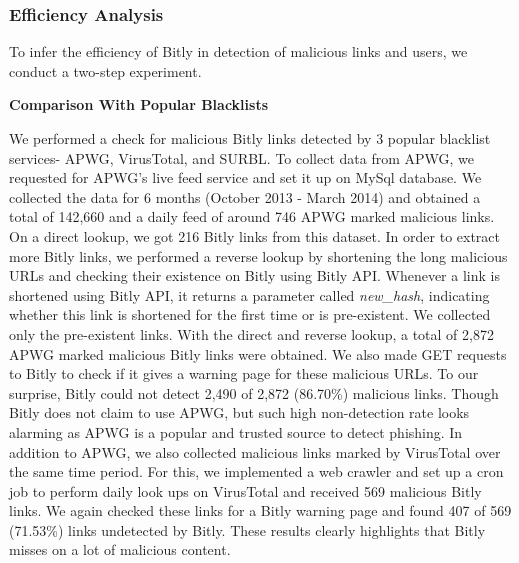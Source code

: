 \documentclass[conference]{IEEEtran}
\begin{document}
\subsubsection{Efficiency Analysis}\label{Efficiency Analysis}
To infer the efficiency of Bitly in detection of malicious links and users, we conduct a two-step experiment.

\vspace{4pt}
\textbf{Comparison With Popular Blacklists}


We performed a check for malicious Bitly links detected by 3 popular blacklist services- APWG, VirusTotal, and SURBL.
To collect data from APWG, we requested for APWG's live feed service and set it up on MySql database. We collected the data for 6 months (October 2013 - March 2014) and obtained a total of 142,660 and a daily feed of around 746 APWG marked malicious links. On a direct lookup, we got 216 Bitly links from this dataset. In order to extract more Bitly links, we performed a reverse lookup by shortening the long malicious URLs and checking their existence on Bitly using Bitly API. Whenever a link is shortened using Bitly API, it returns a parameter called \textit{new\_hash}, indicating whether this link is shortened for the first time or is pre-existent. We collected only the pre-existent links. With the direct and reverse lookup, a total of 2,872 APWG marked malicious Bitly links were obtained. We also made GET requests to Bitly to check if it gives a warning page for these malicious URLs. To our surprise, Bitly could not detect 2,490 of 2,872 (86.70\%) malicious links. Though Bitly does not claim to use APWG, but such high non-detection rate looks alarming as APWG is a popular and trusted source to detect phishing. In addition to APWG, we also collected malicious links marked by VirusTotal over the same time period. For this, we implemented a web crawler and set up a cron job to perform daily look ups on VirusTotal and received 569 malicious Bitly links. We again checked these links for a Bitly warning page and found 407 of 569 (71.53\%) links undetected by Bitly. These results clearly highlights that Bitly misses on a lot of malicious content.
\end{document}
